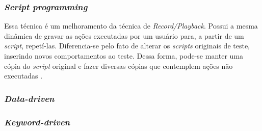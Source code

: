 \subsubsection{\textit{Script programming}}
Essa técnica é um melhoramento da técnica de \textit{Record/Playback}. Possui a mesma dinâmica de gravar as ações executadas por um usuário para, a partir de um \textit{script}, repetí-las. Diferencia-se pelo fato de alterar os \textit{scripts} originais de teste, inserindo novos comportamentos ao teste. Dessa forma, pode-se manter uma cópia do \textit{script} original e fazer diversas cópias que contemplem ações não executadas \cite{kent2007}.
\par
\indent
\subsubsection{\textit{Data-driven}}
\subsubsection{\textit{Keyword-driven}}












